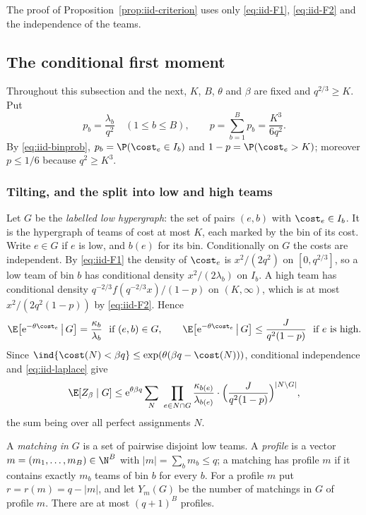 \begin{remark}\label{rem:iid-laws}
The proof of Proposition~\ref{prop:iid-criterion} uses only \eqref{eq:iid-F1},
\eqref{eq:iid-F2} and the independence of the teams.
\end{remark}

\subsection{The conditional first moment}\label{subsec:iid-firstmoment}

Throughout this subsection and the next, $K$, $B$, $\theta$ and $\beta$ are fixed and
$q^{2/3}\ge K$. Put
\[
p_b=\frac{\lambda_b}{q^2}\quad(1\le b\le B),\qquad p=\sum_{b=1}^Bp_b=\frac{K^3}{6q^2}.
\]
By \eqref{eq:iid-binprob}, $p_b=\P(\cost_e\in I_b)$ and $1-p=\P(\cost_e>K)$; moreover
$p\le1/6$ because $q^2\ge K^3$.

\subsubsection*{Tilting, and the split into low and high teams}
Let $G$ be the \emph{labelled low hypergraph}: the set of pairs $(e,b)$ with
$\cost_e\in I_b$. It is the hypergraph of teams of cost at most $K$, each marked by the bin
of its cost. Write $e\in G$ if $e$ is low, and $b(e)$ for its bin. Conditionally on $G$ the
costs are independent. By \eqref{eq:iid-F1} the density of $\cost_e$ is $x^2/(2q^2)$ on
$[0,q^{2/3}]$, so a low team of bin $b$ has conditional density $x^2/(2\lambda_b)$ on
$I_b$. A high team has conditional density $q^{-2/3}f(q^{-2/3}x)/(1-p)$ on $(K,\infty)$,
which is at most $x^2/(2q^2(1-p))$ by \eqref{eq:iid-F2}. Hence
\begin{equation}\label{eq:iid-laplace}
\E\bigl[\mathrm{e}^{-\theta\cost_e}\,\big|\,G\bigr]=\frac{\kappa_b}{\lambda_b}
\ \text{ if }(e,b)\in G,\qquad
\E\bigl[\mathrm{e}^{-\theta\cost_e}\,\big|\,G\bigr]\le\frac{J}{q^2(1-p)}
\ \text{ if $e$ is high.}
\end{equation}
Since $\ind\{\cost(N)<\beta q\}\le\exp(\theta(\beta q-\cost(N)))$, conditional independence
and \eqref{eq:iid-laplace} give
\begin{equation}\label{eq:iid-tilt}
\E[Z_\beta\mid G]\le\mathrm{e}^{\theta\beta q}\sum_{N}\ \prod_{e\in N\cap G}
\frac{\kappa_{b(e)}}{\lambda_{b(e)}}\cdot\Bigl(\frac{J}{q^2(1-p)}\Bigr)^{|N\setminus G|},
\end{equation}
the sum being over all perfect assignments $N$.

A \emph{matching in $G$} is a set of pairwise disjoint low teams. A \emph{profile} is a
vector $m=(m_1,\dots,m_B)\in\N^B$ with $|m|=\sum_bm_b\le q$; a matching has profile $m$ if
it contains exactly $m_b$ teams of bin $b$ for every $b$. For a profile $m$ put
$r=r(m)=q-|m|$, and let $Y_m(G)$ be the number of matchings in $G$ of profile $m$. There
are at most $(q+1)^B$ profiles.

